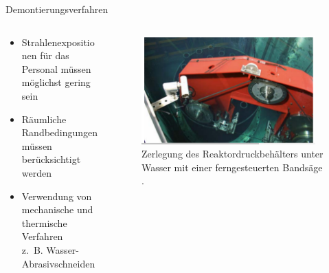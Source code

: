 \begin{frame}{Demontierungsverfahren}
  \begin{columns}

    \begin{column}{0.48\textwidth}
    \begin{itemize}
      \setlength\itemsep{1.2em}
      \item{ Strahlenexpositionen für das Personal müssen möglichst gering sein }
      \item{ Räumliche Randbedingungen müssen berücksichtigt werden}
      \item{ Verwendung von mechanische und thermische Verfahren  \\ z.\, B. Wasser-Abrasivschneiden}

    \end{itemize}

    \end{column}

    \begin{column}{0.48\textwidth}
      \begin{figure}
         \centering
         \includegraphics[width=0.95\textwidth]{./bilder/zerlegung_bandsaege.PNG}
         \caption{Zerlegung des Reaktordruckbehälters unter Wasser mit einer ferngesteuerten Bandsäge \cite{stilllegung_grs}. }
         \label{ fig: abbau_roboter}
       \end{figure}
    \end{column}

  \end{columns}
\end{frame}



